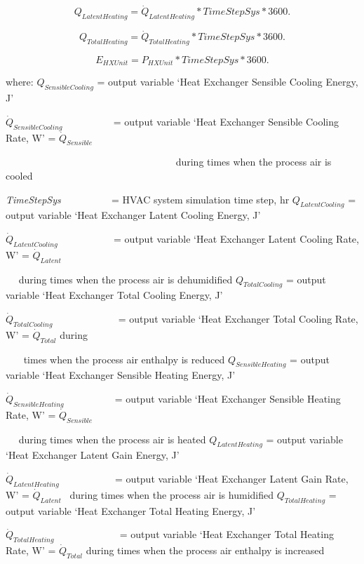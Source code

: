 \begin{equation}
{Q_{LatentHeating}} = {\dot Q_{LatentHeating}}*TimeStepSys*3600.
\end{equation}

\begin{equation}
{Q_{TotalHeating}} = {\dot Q_{TotalHeating}}*TimeStepSys*3600.
\end{equation}

\begin{equation}
{E_{HXUnit}} = {P_{HXUnit}}*TimeStepSys*3600.
\end{equation}

where: \(Q_{SensibleCooling}\) = output variable `Heat Exchanger Sensible Cooling Energy, J'

\({\dot Q_{SensibleCooling}}\) ~~~~~~~~~ = output variable `Heat Exchanger Sensible Cooling Rate, W' = \({\dot Q_{Sensible}}\)

~~~~~~~~~~~~~~~~~~~~~~~~~~~~~~~~~~ during times when the process air is cooled

\emph{TimeStepSys} ~~~~~~~~~ = HVAC system simulation time step, hr \(Q_{LatentCooling}\) = output variable `Heat Exchanger Latent Cooling Energy, J'

\({\dot Q_{LatentCooling}}\) ~~~~~~~~~~ = output variable `Heat Exchanger Latent Cooling Rate, W' = \({\dot Q_{Latent}}\)

~~ during times when the process air is dehumidified \(Q_{TotalCooling}\) = output variable `Heat Exchanger Total Cooling Energy, J'

\({\dot Q_{TotalCooling}}\) ~~~~~~~~~~~~ = output variable `Heat Exchanger Total Cooling Rate, W' = \({\dot Q_{Total}}\) during

~~~ times when the process air enthalpy is reduced \(Q_{SensibleHeating}\) = output variable `Heat Exchanger Sensible Heating Energy, J'

\({\dot Q_{SensibleHeating}}\) ~~~~~~~~~ = output variable `Heat Exchanger Sensible Heating Rate, W' = \({\dot Q_{Sensible}}\)

~~ during times when the process air is heated \(Q_{LatentHeating}\) = output variable `Heat Exchanger Latent Gain Energy, J'

\({\dot Q_{LatentHeating}}\) ~~~~~~~~~~ = output variable `Heat Exchanger Latent Gain Rate, W' = \({\dot Q_{Latent}}\) ~during times when the process air is humidified \(Q_{TotalHeating}\) = output variable `Heat Exchanger Total Heating Energy, J'

\({\dot Q_{TotalHeating}}\) ~~~~~~~~~~~~ = output variable `Heat Exchanger Total Heating Rate, W' = \({\dot Q_{Total}}\) during times when the process air enthalpy is increased

